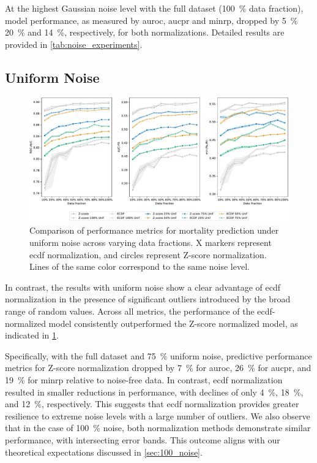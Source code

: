 At the highest Gaussian noise level with the full dataset (\qty{100}{\percent} data fraction), model performance, as measured by \gls{auroc}, \gls{aucpr} and \gls{minrp}, dropped by \qty{5}{\percent} \qty{20}{\percent} and \qty{14}{\percent}, respectively, for both normalizations. Detailed results are provided in \cref{tab:noise_experiments}.



\subsection{Uniform Noise}
\label{sec:uniform_noise}

\begin{figure}
    \centering
    \includegraphics[width=\textwidth]{./figures/uniform_noise_results}
    \caption{Comparison of performance metrics for mortality prediction under uniform noise across varying data fractions. X markers represent \gls{ecdf} normalization, and circles represent Z-score normalization. Lines of the same color correspond to the same noise level.}
    \label{fig:uniform_noise_results}
\end{figure}


In contrast, the results with uniform noise show a clear advantage of \gls{ecdf} normalization in the presence of significant outliers introduced by the broad range of random values. Across all metrics, the performance of the \gls{ecdf}-normalized model consistently outperformed the Z-score normalized model, as indicated in \cref{fig:uniform_noise_results}.

Specifically, with the full dataset and \qty{75}{\percent} uniform noise, predictive performance metrics for Z-score normalization dropped by \qty{7}{\percent} for \gls{auroc}, \qty{26}{\percent} for \gls{aucpr}, and \qty{19}{\percent} for \gls{minrp} relative to noise-free data. In contrast, \gls{ecdf} normalization resulted in smaller reductions in performance, with declines of only \qty{4}{\percent}, \qty{18}{\percent}, and \qty{12}{\percent}, respectively. This suggests that \gls{ecdf} normalization provides greater resilience to extreme noise levels with a large number of outliers. We also observe that in the case of \qty{100}{\percent} noise, both normalization methods demonstrate similar performance, with intersecting error bands. This outcome aligns with our theoretical expectations discussed in \cref{sec:100_noise}.


